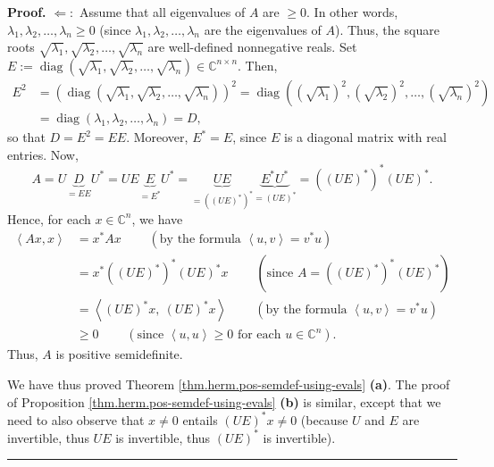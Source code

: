\documentclass[numbers=enddot,12pt,final,onecolumn,notitlepage]{scrartcl}%
\numberwithin{exer}{subsection}
\theoremstyle{definition}
\newenvironment{proof}[1][Proof]{\noindent\textbf{#1.} }{\ \rule{0.5em}{0.5em}}
\begin{document}
\begin{proof}
$\Longleftarrow:$ Assume that all eigenvalues of $A$ are $\geq0$. In other
words, $\lambda_{1},\lambda_{2},\ldots,\lambda_{n}\geq0$ (since $\lambda
_{1},\lambda_{2},\ldots,\lambda_{n}$ are the eigenvalues of $A$). Thus, the
square roots $\sqrt{\lambda_{1}},\sqrt{\lambda_{2}},\ldots,\sqrt{\lambda_{n}}$
are well-defined nonnegative reals. Set $E:=\operatorname*{diag}\left(
\sqrt{\lambda_{1}},\sqrt{\lambda_{2}},\ldots,\sqrt{\lambda_{n}}\right)
\in\mathbb{C}^{n\times n}$. Then,%
\begin{align*}
E^{2}  &  =\left(  \operatorname*{diag}\left(  \sqrt{\lambda_{1}}%
,\sqrt{\lambda_{2}},\ldots,\sqrt{\lambda_{n}}\right)  \right)  ^{2}%
=\operatorname*{diag}\left(  \left(  \sqrt{\lambda_{1}}\right)  ^{2},\left(
\sqrt{\lambda_{2}}\right)  ^{2},\ldots,\left(  \sqrt{\lambda_{n}}\right)
^{2}\right) \\
&  =\operatorname*{diag}\left(  \lambda_{1},\lambda_{2},\ldots,\lambda
_{n}\right)  =D,
\end{align*}
so that $D=E^{2}=EE$. Moreover, $E^{\ast}=E$, since $E$ is a diagonal matrix
with real entries. Now,%
\[
A=U\underbrace{D}_{=EE}U^{\ast}=UE\underbrace{E}_{=E^{\ast}}U^{\ast
}=\underbrace{UE}_{=\left(  \left(  UE\right)  ^{\ast}\right)  ^{\ast}%
}\underbrace{E^{\ast}U^{\ast}}_{=\left(  UE\right)  ^{\ast}}=\left(  \left(
UE\right)  ^{\ast}\right)  ^{\ast}\left(  UE\right)  ^{\ast}.
\]
Hence, for each $x\in\mathbb{C}^{n}$, we have%
\begin{align*}
\left\langle Ax,x\right\rangle  &  =x^{\ast}Ax\ \ \ \ \ \ \ \ \ \ \left(
\text{by the formula }\left\langle u,v\right\rangle =v^{\ast}u\right) \\
&  =x^{\ast}\left(  \left(  UE\right)  ^{\ast}\right)  ^{\ast}\left(
UE\right)  ^{\ast}x\ \ \ \ \ \ \ \ \ \ \left(  \text{since }A=\left(  \left(
UE\right)  ^{\ast}\right)  ^{\ast}\left(  UE\right)  ^{\ast}\right) \\
&  =\left\langle \left(  UE\right)  ^{\ast}x,\ \left(  UE\right)  ^{\ast
}x\right\rangle \ \ \ \ \ \ \ \ \ \ \left(  \text{by the formula }\left\langle
u,v\right\rangle =v^{\ast}u\right) \\
&  \geq0\ \ \ \ \ \ \ \ \ \ \left(  \text{since }\left\langle u,u\right\rangle
\geq0\text{ for each }u\in\mathbb{C}^{n}\right)  .
\end{align*}
Thus, $A$ is positive semidefinite.

We have thus proved Theorem \ref{thm.herm.pos-semdef-using-evals}
\textbf{(a)}. The proof of Proposition \ref{thm.herm.pos-semdef-using-evals}
\textbf{(b)} is similar, except that we need to also observe that $x\neq0$
entails $\left(  UE\right)  ^{\ast}x\neq0$ (because $U$ and $E$ are
invertible, thus $UE$ is invertible, thus $\left(  UE\right)  ^{\ast}$ is invertible).
\end{proof}
\end{document}
